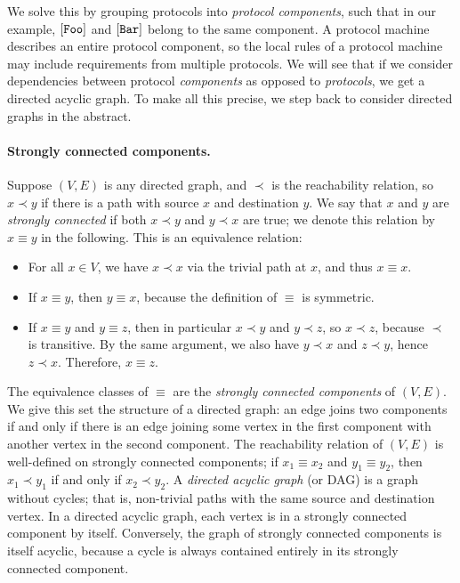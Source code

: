 \documentclass[../generics]{subfiles}
\begin{document}
We solve this by grouping protocols into \emph{protocol components}, such that in our example, $[\texttt{Foo}]$ and $[\texttt{Bar}]$ belong to the same component. A protocol machine describes an entire protocol component, so the local rules of a protocol machine may include requirements from multiple protocols. We will see that if we consider dependencies between protocol \emph{components} as opposed to \emph{protocols}, we get a directed acyclic graph. To make all this precise, we step back to consider directed graphs in the abstract.

\paragraph{Strongly connected components.}
Suppose $(V, E)$ is any directed graph, and $\prec$ is the reachability relation, so $x\prec y$ if there is a path with source $x$ and destination $y$. We say that $x$ and $y$ are \emph{strongly connected} if both $x\prec y$ and $y\prec x$ are true; we denote this relation by $x\equiv y$ in the following. This is an equivalence relation:
\begin{itemize}
\item For all $x\in V$, we have $x\prec x$ via the trivial path at $x$, and thus $x\equiv x$.
\item If $x\equiv y$, then $y\equiv x$, because the definition of $\equiv$ is symmetric.
\item If $x\equiv y$ and $y\equiv z$, then in particular $x\prec y$ and $y\prec z$, so $x\prec z$, because $\prec$ is transitive. By the same argument, we also have $y\prec x$ and $z\prec y$, hence $z\prec x$. Therefore, $x\equiv z$.
\end{itemize}

The equivalence classes of $\equiv$ are the \emph{strongly connected components} of $(V, E)$. We give this set the structure of a directed graph: an edge joins two components if and only if there is an edge joining some vertex in the first component with another vertex in the second component. The reachability relation of $(V, E)$ is well-defined on strongly connected components; if $x_1\equiv x_2$ and $y_1\equiv y_2$, then $x_1\prec y_1$ if and only if $x_2\prec y_2$. A \emph{directed acyclic graph} (or DAG) is a graph without cycles; that is, non-trivial paths with the same source and destination vertex. In a directed acyclic graph, each vertex is in a strongly connected component by itself. Conversely, the graph of strongly connected components is itself acyclic, because a cycle is always contained entirely in its strongly connected component.
\end{document}
